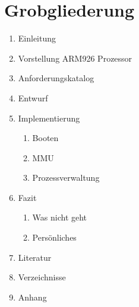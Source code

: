 \documentclass[fontsize=12pt]{scrreprt}
\begin{document}
\chapter{Grobgliederung}

\begin{enumerate}
	\item Einleitung
	\item Vorstellung ARM926 Prozessor
	\item Anforderungskatalog
	\item Entwurf
	\item Implementierung
		\begin{enumerate}
			\item Booten
			\item MMU
			\item Prozessverwaltung
		\end{enumerate}
	\item Fazit
		\begin{enumerate}
			\item Was nicht geht
			\item Pers\"onliches
		\end{enumerate}		
	\item Literatur
	\item Verzeichnisse
	\item Anhang
\end{enumerate}
\end{document}
